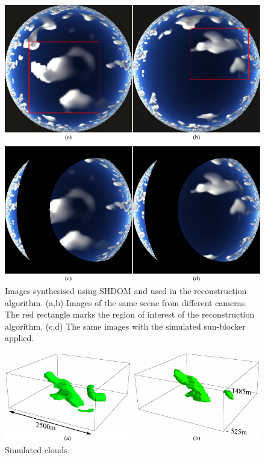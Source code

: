 \documentclass[runningheads]{llncs}
\begin{document}
\begin{figure}
  \begin{center}
    \includegraphics{figures/simulation_imgs}
    \caption{Images synthesised using SHDOM and used in the
      reconstruction algorithm.  (a,b) Images of the same scene from
      different cameras. The red rectangle marks the region of
      interest of the reconstruction algorithm. (c,d) The same images
      with the simulated sun-blocker applied.}
    \label{fig:simulation_imgs1}
  \end{center}
\end{figure}

\begin{figure}
  \begin{center}
    \includegraphics{figures/clouds3d_SHDOM}
    \caption{Simulated clouds.}
    \label{fig:simulation_imgs2}
  \end{center}
\end{figure}
\end{document}
